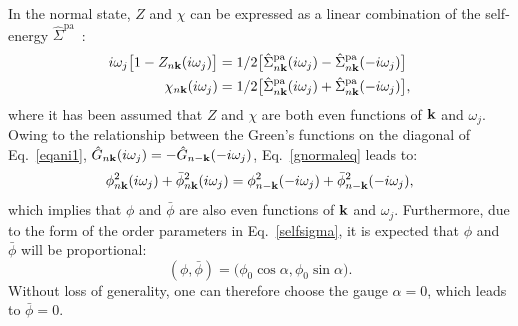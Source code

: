 \documentclass[final,3p,times,twocolumn]{elsarticle}
\begin{document}
In the normal state, $Z$ and $\chi$ can be expressed as a linear combination of the self-energy $\hat{\Sigma}^{\text{pa}}$~\cite{Allen1983a}:
\begin{align}
i\omega_j\big[1-Z_{n\bf{k}}(i\omega_j) \big] &= 1/2 \big[ \hat{\Sigma}_{n\mathbf{k}}^{\text{pa}} (i\omega_j)  - \hat{\Sigma}_{n\mathbf{k}}^{\text{pa}} (-i\omega_j) \big] \\
\chi_{n\bf{k}}(i\omega_j) &= 1/2 \big[ \hat{\Sigma}_{n\mathbf{k}}^{\text{pa}} (i\omega_j)  + \hat{\Sigma}_{n\mathbf{k}}^{\text{pa}} (-i\omega_j) \big], 
\end{align}
where it has been assumed that $Z$ and $\chi$ are both even functions of $\bf{k}$ and $\omega_j$.
Owing to the relationship between the Green's functions on the diagonal of Eq.~\eqref{eqani1}, $\hat{G}_{n\bf{k}}(i\omega_j)=-\hat{G}_{n-\bf{k}}(-i\omega_j)$,  Eq.~\eqref{gnormaleq} leads to: 
\begin{equation}
\phi_{n\bf{k}}^2(i\omega_j)+\bar{\phi}_{n\bf{k}}^2(i\omega_j)  = \phi_{n-\bf{k}}^2(-i\omega_j) + \bar{\phi}_{n-\bf{k}}^2(-i\omega_j), 
\end{equation}
which implies that $\phi$ and $\bar{\phi}$ are also even functions of $\bf{k}$ and $\omega_j$.
Furthermore, due to the form of the order parameters in Eq.~\eqref{selfsigma}, it is expected that $\phi$ and $\bar{\phi}$ will be proportional: 
\begin{equation}
(\phi,\bar{\phi}) = \big(\phi_0 \cos \alpha, \phi_0 \sin \alpha \big).
\end{equation}
Without loss of generality, one can therefore choose the gauge $\alpha=0$, which leads to $\bar{\phi}=0$. 
\end{document}
